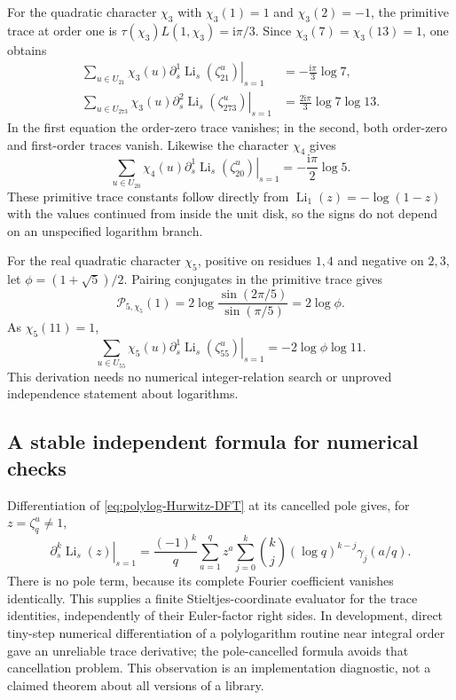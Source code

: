 \documentclass[11pt]{article}
\numberwithin{equation}{section}
\theoremstyle{definition}
\theoremstyle{remark}
\DeclareMathOperator{\Li}{Li}
\newcommand{\ii}{\mathrm i}
\newcommand{\cP}{\mathcal P}
\newcommand{\Liord}[2]{\left.\partial_s^{#1}\Li_s(#2)\right|_{s=1}}
\begin{document}
For the quadratic character $\chi_3$ with $\chi_3(1)=1$ and
$\chi_3(2)=-1$, the primitive trace at order one is
$\tau(\chi_3)L(1,\chi_3)=\ii\pi/3$. Since
$\chi_3(7)=\chi_3(13)=1$, one obtains
\begin{align}
 \sum_{u\in U_{21}}\chi_3(u)\Liord{1}{\zeta_{21}^u}
 &=-\frac{\ii\pi}{3}\log7,\label{eq:chi3-21}\\
 \sum_{u\in U_{273}}\chi_3(u)\Liord{2}{\zeta_{273}^u}
 &=\frac{2\ii\pi}{3}\log7\log13.\label{eq:chi3-273}
\end{align}
In the first equation the order-zero trace vanishes; in the second,
both order-zero and first-order traces vanish.
Likewise the character $\chi_4$ gives
\begin{equation}\label{eq:chi4-20}
 \sum_{u\in U_{20}}\chi_4(u)\Liord{1}{\zeta_{20}^u}
 =-\frac{\ii\pi}{2}\log5.
\end{equation}
These primitive trace constants follow directly from
$\Li_1(z)=-\log(1-z)$ with the values continued from inside the unit
disk, so the signs do not depend on an unspecified logarithm branch.

For the real quadratic character $\chi_5$, positive on residues
$1,4$ and negative on $2,3$, let $\phi=(1+\sqrt5)/2$.
Pairing conjugates in the primitive trace gives
\[
 \cP_{5,\chi_5}(1)
 =2\log\frac{\sin(2\pi/5)}{\sin(\pi/5)}=2\log\phi.
\]
As $\chi_5(11)=1$,
\begin{equation}\label{eq:chi5-55}
 \sum_{u\in U_{55}}\chi_5(u)\Liord{1}{\zeta_{55}^u}
 =-2\log\phi\log11.
\end{equation}
This derivation needs no numerical integer-relation search or
unproved independence statement about logarithms.

\subsection{A stable independent formula for numerical checks}
Differentiation of \eqref{eq:polylog-Hurwitz-DFT} at its cancelled pole
gives, for $z=\zeta_q^u\ne1$,
\begin{equation}\label{eq:stable-polylog-jet}
 \Liord{k}{z}
 =\frac{(-1)^k}{q}\sum_{a=1}^q z^a
 \sum_{j=0}^k\binom kj(\log q)^{k-j}\gamma_j(a/q).
\end{equation}
There is no pole term, because its complete Fourier coefficient
vanishes identically. This supplies a finite Stieltjes-coordinate
evaluator for the trace identities, independently of their
Euler-factor right sides. In development, direct tiny-step numerical
differentiation of a polylogarithm routine near integral order gave
an unreliable trace derivative; the pole-cancelled formula avoids
that cancellation problem. This observation is an implementation
diagnostic, not a claimed theorem about all versions of a library.
\end{document}

